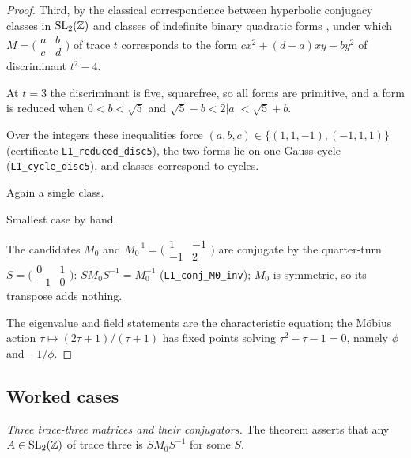 \documentclass[11pt,a4paper]{article}
\theoremstyle{plain}
\theoremstyle{definition}
\theoremstyle{remark}
\begin{document}
\begin{proof}
Third, by the classical correspondence between hyperbolic conjugacy classes in $\mathrm{SL}_{2}(\mathbb{Z})$ and classes of indefinite binary quadratic forms \cite{Gauss1801,Sarnak1982}, under which $M=\bigl(\begin{smallmatrix}a&b\\c&d\end{smallmatrix}\bigr)$ of trace $t$ corresponds to the form $cx^{2}+(d-a)xy-by^{2}$ of discriminant $t^{2}-4$.

At $t=3$ the discriminant is five, squarefree, so all forms are primitive, and a form is reduced when $0<b<\sqrt5$ and $\sqrt5-b<2\lvert a\rvert<\sqrt5+b$.

Over the integers these inequalities force $(a,b,c)\in\{(1,1,-1),(-1,1,1)\}$ (certificate \texttt{L1\_reduced\_disc5}), the two forms lie on one Gauss cycle (\texttt{L1\_cycle\_disc5}), and classes correspond to cycles.

Again a single class.

Smallest case by hand.

The candidates $M_{0}$ and $M_{0}^{-1}=\bigl(\begin{smallmatrix}1&-1\\-1&2\end{smallmatrix}\bigr)$ are conjugate by the quarter-turn $S=\bigl(\begin{smallmatrix}0&1\\-1&0\end{smallmatrix}\bigr)$: $SM_{0}S^{-1}=M_{0}^{-1}$ (\texttt{L1\_conj\_M0\_inv}); $M_{0}$ is symmetric, so its transpose adds nothing.

The eigenvalue and field statements are the characteristic equation; the M\"obius action $\tau\mapsto(2\tau+1)/(\tau+1)$ has fixed points solving $\tau^{2}-\tau-1=0$, namely $\phi$ and $-1/\phi$.
\end{proof}

\subsection{Worked cases}\label{sec:drive-worked}

\emph{Three trace-three matrices and their conjugators.} The theorem asserts that any $A\in\mathrm{SL}_{2}(\mathbb{Z})$ of trace three is $SM_{0}S^{-1}$ for some $S$.
\end{document}
